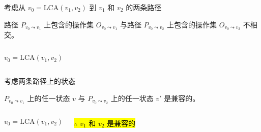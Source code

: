 \begin{frame}{}
  \centerline{ 考虑从 $v_0 = \text{LCA}(v_1, v_2)$ 到 $v_1$ 和 $v_2$ 的两条路径}

  \begin{clemma}
    路径 $P_{v_0 \leadsto v_1}$ 上包含的操作集 $O_{v_0 \leadsto v_1}$ 与路径 $P_{v_0 \leadsto v_2}$ 上包含的操作集
    $O_{v_0 \leadsto v_2}$ 不相交。
  \end{clemma}

  \begin{columns}
	\[
	  v_0 = \text{LCA}(v_1, v_2)
	\]
  \end{columns}
\end{frame}

\begin{frame}{}
  \centerline{ 考虑两条路径上的状态}

  \begin{clemma}
    $P_{v_0 \leadsto v_1}$ 上的任一状态 $v$ 与 $P_{v_0 \leadsto v_2}$ 上的任一状态 $v'$ 是兼容的。
  \end{clemma}

  \begin{columns}
	\[
	  v_0 = \text{LCA}(v_1, v_2)
	\]

	\pause
	\vspace{0.50cm}
	\begin{center}
	  \hl{$\therefore$ $v_1$ 和 $v_2$ 是兼容的}
	\end{center}
  \end{columns}
\end{frame}
